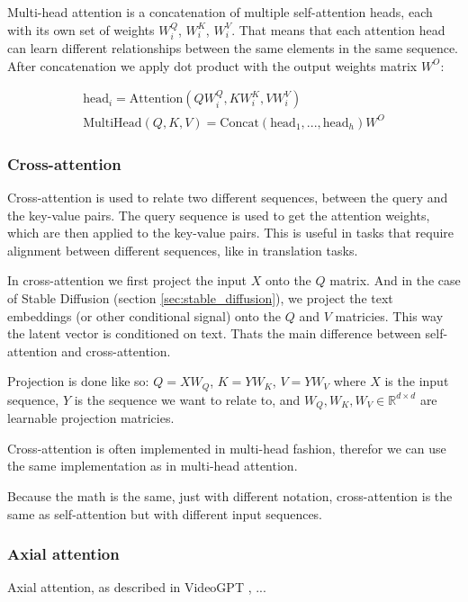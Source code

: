 Multi-head attention is a concatenation of multiple self-attention heads, each with its own set of weights $W_i^Q$, $W_i^K$, $W_i^V$. That means that each attention head can learn different relationships between the same elements in the same sequence. After concatenation we apply dot product with the output weights matrix $W^O$:

\begin{equation}
    \begin{aligned}
        \text{head}_i = \text{Attention}(QW_i^Q, KW_i^K, VW_i^V)  \\
        \text{MultiHead}(Q, K, V) = \text{Concat}(\text{head}_1, ..., \text{head}_h)W^O
    \end{aligned}
\end{equation}









\subsubsection{Cross-attention}

Cross-attention is used to relate two different sequences, between the query and the key-value pairs. The query sequence is used to get the attention weights, which are then applied to the key-value pairs. This is useful in tasks that require alignment between different sequences, like in translation tasks.

In cross-attention we first project the input $X$ onto the $Q$ matrix. And in the case of Stable Diffusion (section \ref{sec:stable_diffusion}), we project the text embeddings (or other conditional signal) onto the $Q$ and $V$ matricies. This way the latent vector is conditioned on text. Thats the main difference between self-attention and cross-attention.

Projection is done like so: $Q = XW_Q$, $K = YW_K$, $V = YW_V$ where $X$ is the input sequence, $Y$ is the sequence we want to relate to, and $W_Q, W_K, W_V \in \mathbb{R}^{d \times d}$ are learnable projection matricies.

Cross-attention is often implemented in multi-head fashion, therefor we can use the same implementation as in multi-head attention.

Because the math is the same, just with different notation, cross-attention is the same as self-attention but with different input sequences.







\subsubsection{Axial attention}

Axial attention, as described in VideoGPT \cite{videogpt}, ...












